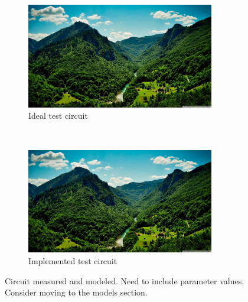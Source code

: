 \begin{figure}[H]
\centering
    \begin{subfigure}[b]{\textwidth}
        \centering
        \includegraphics[width=0.9\textwidth]{images/awesome_view.jpg}
        \caption{Ideal test circuit}
    \end{subfigure}
    \\
    \vspace{0.1 in}
    \begin{subfigure}[b]{\textwidth}
        \centering
        \includegraphics[width=0.9\textwidth]{images/awesome_view.jpg}
        \caption{Implemented test circuit}
    \end{subfigure}
    \caption{Circuit measured and modeled. Need to include parameter values. Consider moving to the models section.}
    \label{fig:IS_DAQ_test_circuit}
\end{figure}

